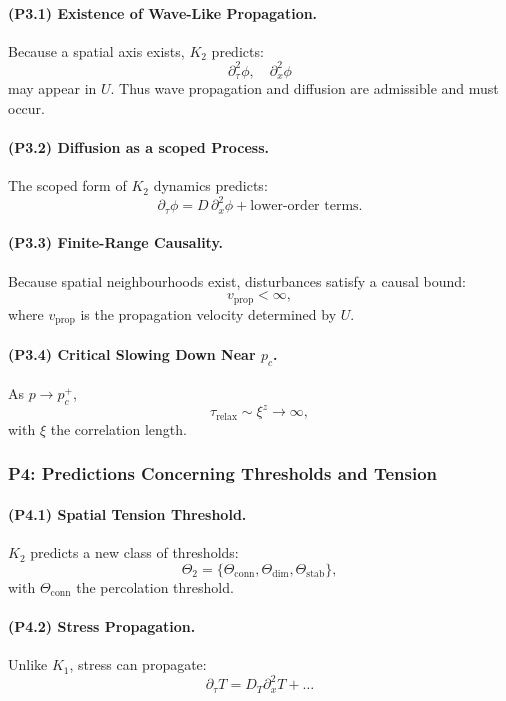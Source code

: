 \paragraph{(P3.1) Existence of Wave-Like Propagation.}
Because a spatial axis exists, $K_2$ predicts:
\[
\partial_\tau^2 \phi, \quad \partial_x^2 \phi
\]
may appear in $U$.
Thus wave propagation and diffusion are admissible and must occur.

\paragraph{(P3.2) Diffusion as a scoped Process.}
The scoped form of $K_2$ dynamics predicts:
\[
\partial_\tau \phi = D\, \partial_x^2\phi + \text{lower-order terms}.
\]

\paragraph{(P3.3) Finite-Range Causality.}
Because spatial neighbourhoods exist, disturbances satisfy a causal bound:
\[
v_{\mathrm{prop}} < \infty,
\]
where $v_{\mathrm{prop}}$ is the propagation velocity determined by $U$.

\paragraph{(P3.4) Critical Slowing Down Near \texorpdfstring{$p_c$}{p_c}.}
As $p \to p_c^+$,
\[
\tau_{\mathrm{relax}} \sim \xi^z \to \infty,
\]
with $\xi$ the correlation length.

\subsubsection{P4: Predictions Concerning Thresholds and Tension}

\paragraph{(P4.1) Spatial Tension Threshold.}
$K_2$ predicts a new class of thresholds:
\[
\Theta_2 = \{\Theta_{\mathrm{conn}}, \Theta_{\mathrm{dim}},
\Theta_{\mathrm{stab}}\},
\]
with $\Theta_{\mathrm{conn}}$ the percolation threshold.

\paragraph{(P4.2) Stress Propagation.}
Unlike $K_1$, stress can propagate:
\[
\partial_\tau T = D_T \partial_x^2 T + \ldots
\]

